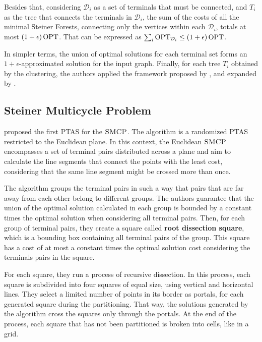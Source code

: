 Besides that, considering \(\mathcal{D}_i\) as a set of terminals that must be connected, and \(T_i\) as the tree that connects the terminals in \(\mathcal{D}_i\), the sum of the costs of all the minimal Steiner Forests, connecting only the vertices within each \(\mathcal{D}_i\), totals at most \((1 + \epsilon) \operatorname{\textrm{OPT}}\). That can be expressed as \(\sum_i \operatorname{\textrm{OPT}}_{\mathcal{D}_i} \leq (1 + \epsilon) \operatorname{\textrm{OPT}}\).

In simpler terms, the union of optimal solutions for each terminal set forms an \(1 + \epsilon\)-approximated solution for the input graph. Finally, for each tree \(T_i\) obtained by the clustering, the authors applied the framework proposed by \cite{KleinTSP}, and expanded by \cite{Borradaile2009b, Borradaile2012}.

\subsection{Steiner Multicycle Problem} \label{subsection:steinermulticycle}

\cite{LINTZMAYER2020134} proposed the first PTAS for the \(\textsc{SMCP}\). The algorithm is a randomized PTAS restricted to the Euclidean plane. In this context, the Euclidean \(\textsc{SMCP}\) encompasses a set of terminal pairs distributed across a plane and aim to calculate the line segments that connect the points with the least cost, considering that the same line segment might be crossed more than once.

The algorithm groups the terminal pairs in such a way that pairs that are far away from each other belong to different groups. The authors guarantee that the union of the optimal solution calculated in each group is bounded by a constant times the optimal solution when considering all terminal pairs. Then, for each group of terminal pairs, they create a square called \textbf{root dissection square}, which is a bounding box containing all terminal pairs of the group. This square has a cost of at most a constant times the optimal solution cost considering the terminals pairs in the square.

For each square, they run a process of recursive dissection. In this process, each square is subdivided into four squares of equal size, using vertical and horizontal lines. They select a limited number of points in its border as portals, for each generated square during the partitioning. That way, the solutions generated by the algorithm cross the squares only through the portals. At the end of the process, each square that has not been partitioned is broken into cells, like in a grid. 

